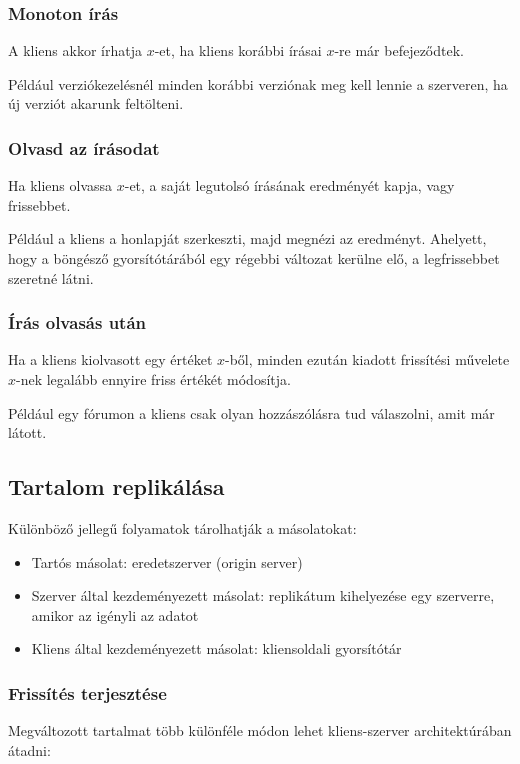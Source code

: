 \documentclass[margin=0px]{article}
\begin{document}
	\subsubsection{Monoton írás}
	
	A kliens akkor írhatja $x$-et, ha kliens korábbi írásai $x$-re már befejeződtek.
	
	Például verziókezelésnél minden korábbi verziónak meg kell lennie a szerveren, ha új verziót akarunk feltölteni.
	
	\subsubsection{Olvasd az írásodat}
	
	Ha kliens olvassa $x$-et, a saját legutolsó írásának eredményét kapja, vagy frissebbet.
	
	Például a kliens a honlapját szerkeszti, majd megnézi az eredményt. Ahelyett, hogy a böngésző gyorsítótárából
	egy régebbi változat kerülne elő, a legfrissebbet szeretné látni.
	
	\subsubsection{Írás olvasás után}
	
	Ha a kliens kiolvasott egy értéket $x$-ből, minden ezután kiadott frissítési művelete $x$-nek legalább
	ennyire friss értékét módosítja.
	
	Például egy fórumon a kliens csak olyan hozzászólásra tud válaszolni, amit már látott.
	
	\subsection{Tartalom replikálása}
	
	Különböző jellegű folyamatok tárolhatják a másolatokat:
	
	\begin{itemize}
		\item	Tartós másolat: eredetszerver (origin server)
		\item	Szerver által kezdeményezett másolat: replikátum kihelyezése egy szerverre, amikor az igényli
		az adatot
		\item	Kliens által kezdeményezett másolat: kliensoldali gyorsítótár
	\end{itemize}
	
	\subsubsection{Frissítés terjesztése}
	Megváltozott tartalmat több különféle módon lehet kliens-szerver architektúrában átadni:
	
\end{document}

